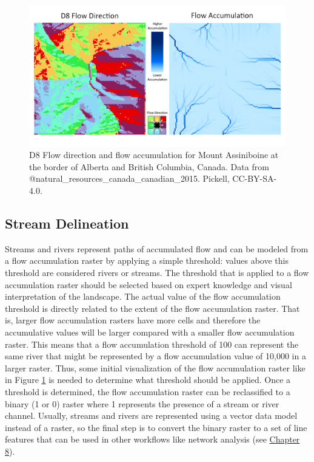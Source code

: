 \documentclass[
]{book}
\begin{document}
\begin{figure}
\includegraphics[width=0.75\linewidth]{images/09-mount-assiniboine-flow-dir-acc} \caption{D8 Flow direction and flow accumulation for Mount Assiniboine at the border of Alberta and British Columbia, Canada. Data from @natural_resources_canada_canadian_2015. Pickell, CC-BY-SA-4.0.}\label{fig:9-mount-assiniboine-flow-dir-acc}
\end{figure}

\hypertarget{stream-delineation}{%
\subsection{Stream Delineation}\label{stream-delineation}}

Streams and rivers represent paths of accumulated flow and can be modeled from a flow accumulation raster by applying a simple threshold: values above this threshold are considered rivers or streams. The threshold that is applied to a flow accumulation raster should be selected based on expert knowledge and visual interpretation of the landscape. The actual value of the flow accumulation threshold is directly related to the extent of the flow accumulation raster. That is, larger flow accumulation rasters have more cells and therefore the accumulative values will be larger compared with a smaller flow accumulation raster. This means that a flow accumulation threshold of 100 can represent the same river that might be represented by a flow accumulation value of 10,000 in a larger raster. Thus, some initial visualization of the flow accumulation raster like in Figure \ref{fig:9-mount-assiniboine-flow-dir-acc} is needed to determine what threshold should be applied. Once a threshold is determined, the flow accumulation raster can be reclassified to a binary (1 or 0) raster where 1 represents the presence of a stream or river channel. Usually, streams and rivers are represented using a vector data model instead of a raster, so the final step is to convert the binary raster to a set of line features that can be used in other workflows like network analysis (see \href{https://ubc-geomatics-textbook.github.io/geomatics-textbook/network-analysis.html}{Chapter 8}).
\end{document}
